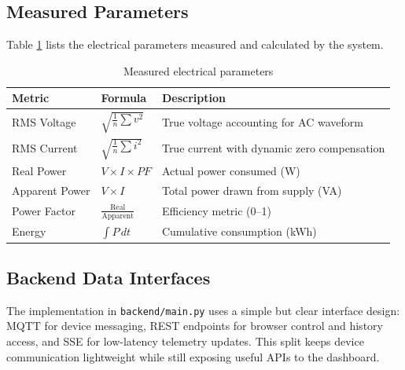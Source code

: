 \documentclass[12pt, a4paper]{article}
\numberwithin{figure}{section}
\numberwithin{table}{section}
\begin{document}
	\subsection{Measured Parameters}
	
	Table \ref{tab:params} lists the electrical parameters measured and calculated by the system.
	
	\begin{table}[H]
		\centering
		\caption{Measured electrical parameters}
		\label{tab:params}
		\vspace{6pt}
		\begin{tabular}{|l|l|p{6cm}|}
			\hline
			\textbf{Metric} & \textbf{Formula} & \textbf{Description} \\
			\hline
			RMS Voltage & $\sqrt{\frac{1}{n}\sum v^2}$ & True voltage accounting for AC waveform \\
			RMS Current & $\sqrt{\frac{1}{n}\sum i^2}$ & True current with dynamic zero compensation \\
			Real Power & $V \times I \times PF$ & Actual power consumed (W) \\
			Apparent Power & $V \times I$ & Total power drawn from supply (VA) \\
			Power Factor & $\frac{\text{Real}}{\text{Apparent}}$ & Efficiency metric (0--1) \\
			Energy & $\int P \, dt$ & Cumulative consumption (kWh) \\
			\hline
		\end{tabular}
	\end{table}
	
	\subsection{Backend Data Interfaces}
	
	The implementation in \texttt{backend/main.py} uses a simple but clear interface design: MQTT for device messaging, REST endpoints for browser control and history access, and SSE for low-latency telemetry updates. This split keeps device communication lightweight while still exposing useful APIs to the dashboard.
	
\end{document}
